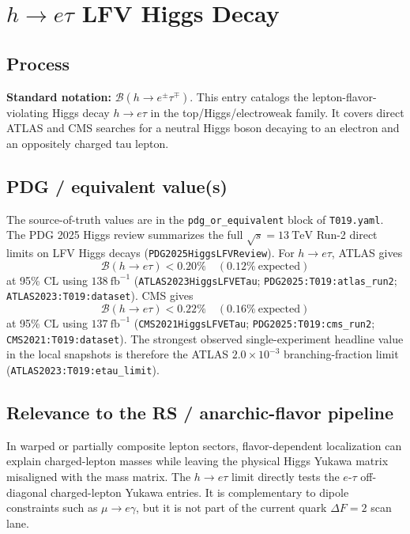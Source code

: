
\section{\texorpdfstring{\(h\to e\tau\)}{h -> e tau} LFV Higgs Decay}

\subsection*{Process}
\textbf{Standard notation:} \(\mathcal{B}(h\to e^\pm\tau^\mp)\).
This entry catalogs the lepton-flavor-violating Higgs decay \(h\to e\tau\)
in the top/Higgs/electroweak family.  It covers direct ATLAS and CMS searches
for a neutral Higgs boson decaying to an electron and an oppositely charged
tau lepton.

\subsection*{PDG / equivalent value(s)}
The source-of-truth values are in the \texttt{pdg\_or\_equivalent} block of
\texttt{T019.yaml}.  The PDG 2025 Higgs review summarizes the full
\(\sqrt{s}=13~\mathrm{TeV}\) Run-2 direct limits on LFV Higgs decays
(\texttt{PDG2025HiggsLFVReview}).  For \(h\to e\tau\), ATLAS gives
\[
  \mathcal{B}(h\to e\tau) < 0.20\% \quad (0.12\%\ \mathrm{expected})
\]
at 95\% CL using \(138~\mathrm{fb}^{-1}\)
(\texttt{ATLAS2023HiggsLFVETau}; \texttt{PDG2025:T019:atlas\_run2};
\texttt{ATLAS2023:T019:dataset}).  CMS gives
\[
  \mathcal{B}(h\to e\tau) < 0.22\% \quad (0.16\%\ \mathrm{expected})
\]
at 95\% CL using \(137~\mathrm{fb}^{-1}\)
(\texttt{CMS2021HiggsLFVETau}; \texttt{PDG2025:T019:cms\_run2};
\texttt{CMS2021:T019:dataset}).  The strongest observed
single-experiment headline value in the local snapshots is therefore the
ATLAS \(2.0\times 10^{-3}\) branching-fraction limit
(\texttt{ATLAS2023:T019:etau\_limit}).

\subsection*{Relevance to the RS / anarchic-flavor pipeline}
In warped or partially composite lepton sectors, flavor-dependent localization
can explain charged-lepton masses while leaving the physical Higgs Yukawa
matrix misaligned with the mass matrix.  The \(h\to e\tau\) limit directly
tests the \(e\)-\(\tau\) off-diagonal charged-lepton Yukawa entries.  It is
complementary to dipole constraints such as \(\mu\to e\gamma\), but it is
not part of the current quark \(\Delta F=2\) scan lane.

